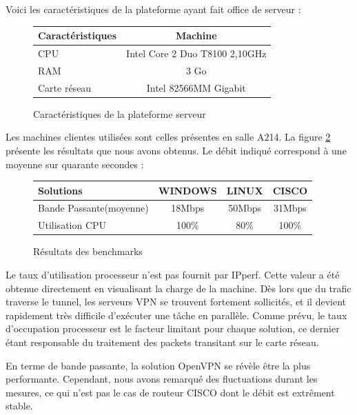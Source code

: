 Voici les caractéristiques de la plateforme ayant fait office de serveur :
\begin{figure}[H]
	\begin{center}
\begin{tabular}{l|c}
Caractéristiques & Machine \\
\hline
CPU & Intel Core 2 Duo T8100 2,10GHz \\
RAM & 3 Go \\
Carte réseau & Intel 82566MM Gigabit \\
\end{tabular}
	\end{center}
	\caption{Caractéristiques de la plateforme serveur}
	\label{Caractéristique_de_la_plateforme_serveur}
\end{figure}

Les machines clientes utilisées sont celles présentes en salle A214. La figure \ref{Résultat_des_benchmarks} présente les résultats que nous avons obtenus. Le débit indiqué correspond à une moyenne sur quarante secondes :

\begin{figure}[H]
	\begin{center}
\begin{tabular}{l|c|c|c}
Solutions & WINDOWS & LINUX & CISCO \\
\hline
Bande Passante(moyenne) & 18Mbps & 50Mbps & 31Mbps \\
Utilisation CPU & 100\% & 80\% & 100\% \\
\end{tabular}
	\end{center}
	\caption{Résultats des benchmarks}
	\label{Résultat_des_benchmarks}
\end{figure}

Le taux d'utilisation processeur n'est pas fournit par IPperf. Cette valeur a été obtenue directement en visualisant la charge de la machine. Dès lors que du trafic traverse le tunnel, les serveurs VPN se trouvent fortement sollicités, et il devient rapidement très difficile d'exécuter une tâche en parallèle. Comme prévu, le taux d'occupation processeur est le facteur limitant pour chaque solution, ce dernier étant responsable du traitement des packets transitant sur le carte réseau.

En terme de bande passante, la solution OpenVPN se révèle être la plus performante. Cependant, nous avons remarqué des fluctuations durant les mesures, ce qui n'est pas le cas de routeur CISCO dont le débit est extrêment stable.
